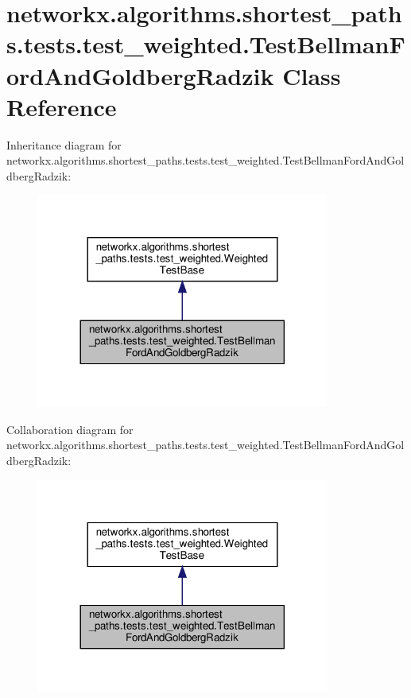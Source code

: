 \hypertarget{classnetworkx_1_1algorithms_1_1shortest__paths_1_1tests_1_1test__weighted_1_1TestBellmanFordAndGoldbergRadzik}{}\section{networkx.\+algorithms.\+shortest\+\_\+paths.\+tests.\+test\+\_\+weighted.\+Test\+Bellman\+Ford\+And\+Goldberg\+Radzik Class Reference}
\label{classnetworkx_1_1algorithms_1_1shortest__paths_1_1tests_1_1test__weighted_1_1TestBellmanFordAndGoldbergRadzik}


Inheritance diagram for networkx.\+algorithms.\+shortest\+\_\+paths.\+tests.\+test\+\_\+weighted.\+Test\+Bellman\+Ford\+And\+Goldberg\+Radzik\+:
\nopagebreak
\begin{figure}[H]
\begin{center}
\leavevmode
\includegraphics[width=272pt]{classnetworkx_1_1algorithms_1_1shortest__paths_1_1tests_1_1test__weighted_1_1TestBellmanFordAndGoldbergRadzik__inherit__graph}
\end{center}
\end{figure}


Collaboration diagram for networkx.\+algorithms.\+shortest\+\_\+paths.\+tests.\+test\+\_\+weighted.\+Test\+Bellman\+Ford\+And\+Goldberg\+Radzik\+:
\nopagebreak
\begin{figure}[H]
\begin{center}
\leavevmode
\includegraphics[width=272pt]{classnetworkx_1_1algorithms_1_1shortest__paths_1_1tests_1_1test__weighted_1_1TestBellmanFordAndGoldbergRadzik__coll__graph}
\end{center}
\end{figure}
